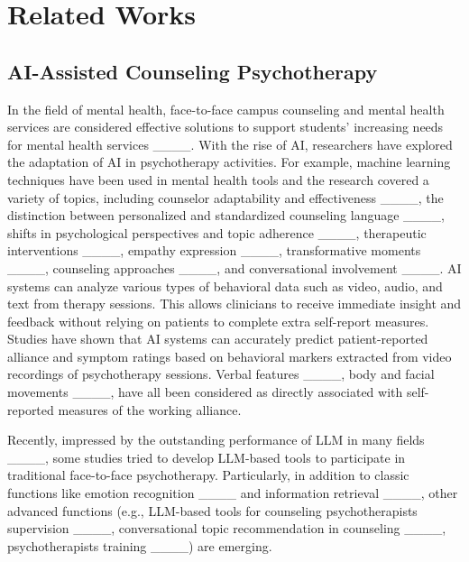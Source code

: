 \section{Related Works}
\subsection{AI-Assisted Counseling Psychotherapy}
In the field of mental health, face-to-face campus counseling and mental health services are considered effective solutions to support students' increasing needs for mental health services ____. With the rise of AI, researchers have explored the adaptation of AI in psychotherapy activities. For example, machine learning techniques have been used in mental health tools and the research covered a variety of topics, including counselor adaptability and effectiveness ____, the distinction between personalized and standardized counseling language ____, shifts in psychological perspectives and topic adherence ____, therapeutic interventions ____, empathy expression ____, transformative moments ____, counseling approaches ____, and conversational involvement ____. AI systems can analyze various types of behavioral data such as video, audio, and text from therapy sessions. This allows clinicians to receive immediate insight and feedback without relying on patients to complete extra self-report measures. Studies have shown that AI systems can accurately predict patient-reported alliance and symptom ratings based on behavioral markers extracted from video recordings of psychotherapy sessions. Verbal features ____, body and facial movements ____, have all been considered as directly associated with self-reported measures of the working alliance.

Recently, impressed by the outstanding performance of LLM in many fields ____, some studies tried to develop LLM-based tools to participate in traditional face-to-face psychotherapy. Particularly, in addition to classic functions like emotion recognition ____ and information retrieval ____, other advanced functions (e.g., LLM-based tools for counseling psychotherapists supervision ____, conversational topic recommendation in counseling ____, psychotherapists training ____) are emerging.

